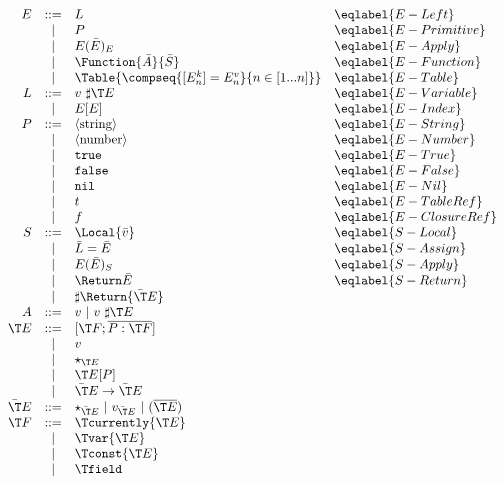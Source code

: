 $$
\begin{array}{rcll}
E &::=& L & \eqlabel{E-Left} \\
  &|&   P & \eqlabel{E-Primitive} \\
  &|&   E(\bar E)_E & \eqlabel{E-Apply} \\
  &|&   \Function{\bar A}{\bar S}  & \eqlabel{E-Function} \\
  &|&   \Table{ \compseq{[E^k_n]=E^v_n}{n\in[1...n]} } & \eqlabel{E-Table} \\
L &::=& v\ \sharp \T E & \eqlabel{E-Variable} \\
  &|&   E[E] & \eqlabel{E-Index} \\
P &::=& \langle\textrm{string}\rangle & \eqlabel{E-String} \\
  &|&   \langle\textrm{number}\rangle & \eqlabel{E-Number} \\
  &|&   \texttt{true} & \eqlabel{E-True} \\
  &|&   \texttt{false} & \eqlabel{E-False} \\
  &|&   \texttt{nil} & \eqlabel{E-Nil} \\
  &|&   t & \eqlabel{E-TableRef} \\
  &|&   f & \eqlabel{E-ClosureRef} \\
S &::=& \Local{\bar v} & \eqlabel{S-Local} \\
  &|&   \bar L = \bar E & \eqlabel{S-Assign} \\
  &|&   E(\bar E)_S & \eqlabel{S-Apply} \\
  &|&   \Return \bar E & \eqlabel{S-Return} \\
  &|&   \sharp \Return{\bar\T E}\\
A &::=& v\ |\  v\ \sharp \T E\\
\T E &::=& [\T F; \overline{P:\T F}]\\
  &|&   v\\
  &|&   \star_{\T E}\\
  &|&   \T E[P]\\
  &|&   \bar\T E \rightarrow \bar\T E\\
\bar\T E &::=& \star_{\bar\T E}\ |\ v_{\bar\T E}\ |\ (\overline{ \T E}) \\
\T F &::=& \Tcurrently{\T E}\\
  &|&   \Tvar{\T E}\\
  &|&   \Tconst{\T E}\\
  &|&   \Tfield\\
\end{array}
$$

